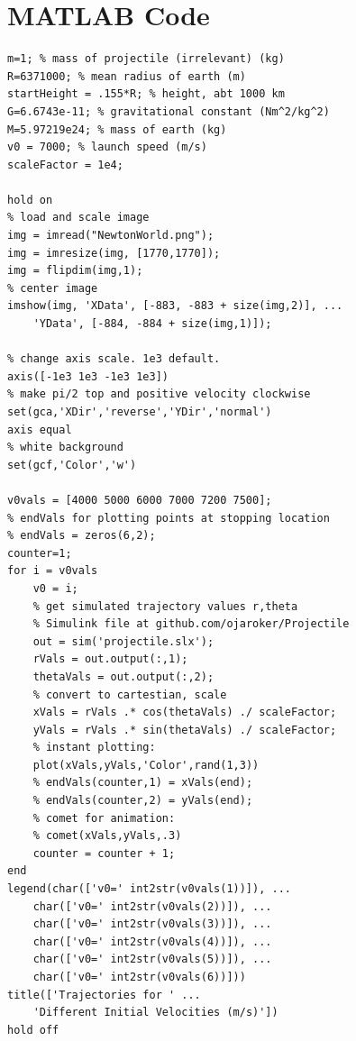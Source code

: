 \documentclass[aps,twocolumn]{revtex4-1}
\begin{document}
\section{MATLAB Code}
\begin{verbatim}
m=1; % mass of projectile (irrelevant) (kg)
R=6371000; % mean radius of earth (m)
startHeight = .155*R; % height, abt 1000 km
G=6.6743e-11; % gravitational constant (Nm^2/kg^2)
M=5.97219e24; % mass of earth (kg)
v0 = 7000; % launch speed (m/s)
scaleFactor = 1e4;

hold on
% load and scale image
img = imread("NewtonWorld.png");
img = imresize(img, [1770,1770]);
img = flipdim(img,1);
% center image
imshow(img, 'XData', [-883, -883 + size(img,2)], ...
    'YData', [-884, -884 + size(img,1)]);

% change axis scale. 1e3 default.
axis([-1e3 1e3 -1e3 1e3])
% make pi/2 top and positive velocity clockwise
set(gca,'XDir','reverse','YDir','normal') 
axis equal
% white background
set(gcf,'Color','w')

v0vals = [4000 5000 6000 7000 7200 7500];
% endVals for plotting points at stopping location
% endVals = zeros(6,2);
counter=1;
for i = v0vals
    v0 = i;
    % get simulated trajectory values r,theta
    % Simulink file at github.com/ojaroker/Projectile
    out = sim('projectile.slx');
    rVals = out.output(:,1);
    thetaVals = out.output(:,2);
    % convert to cartestian, scale
    xVals = rVals .* cos(thetaVals) ./ scaleFactor;
    yVals = rVals .* sin(thetaVals) ./ scaleFactor;
    % instant plotting:
    plot(xVals,yVals,'Color',rand(1,3))
    % endVals(counter,1) = xVals(end);
    % endVals(counter,2) = yVals(end);
    % comet for animation:
    % comet(xVals,yVals,.3)
    counter = counter + 1;
end
legend(char(['v0=' int2str(v0vals(1))]), ...
    char(['v0=' int2str(v0vals(2))]), ...
    char(['v0=' int2str(v0vals(3))]), ...
    char(['v0=' int2str(v0vals(4))]), ...
    char(['v0=' int2str(v0vals(5))]), ...
    char(['v0=' int2str(v0vals(6))]))
title(['Trajectories for ' ...
    'Different Initial Velocities (m/s)'])
hold off
\end{verbatim}
\end{document}

